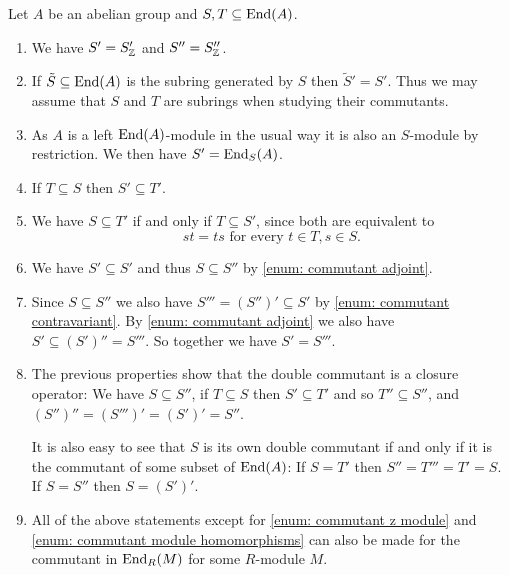 \begin{rem}
  Let $A$ be an abelian group and $S, T \subseteq \operatorname{End}(A)$.
  \begin{enumerate}[label=\emph{\alph*}),leftmargin=*]
    \item \label{enum: commutant z module}
      We have $S' = S'_{\mathbb{Z}}$ and $S'' = S''_{\mathbb{Z}}$.
    \item
      If $\tilde{S} \subseteq \operatorname{End}(A)$ is the subring generated by $S$ then $\tilde{S}' = S'$.
      Thus we may assume that $S$ and $T$ are subrings when studying their commutants.
    \item \label{enum: commutant module homomorphisms}
      As $A$ is a left $\operatorname{End}(A)$-module in the usual way it is also an $S$-module by restriction.
      We then have $S' = \operatorname{End}_S(A)$.
    \item \label{enum: commutant contravariant}
      If $T \subseteq S$ then $S' \subseteq T'$.
    \item \label{enum: commutant adjoint}
      We have $S \subseteq T'$ if and only if $T \subseteq S'$, since both are equivalent to
      \[
        st = ts
        \text{ for every }
        t \in T,
        s \in S.
      \]
    \item
      We have $S' \subseteq S'$ and thus $S \subseteq S''$ by \ref{enum: commutant adjoint}.
    \item
      Since $S \subseteq S''$ we also have $S''' = (S'')' \subseteq S'$ by \ref{enum: commutant contravariant}.
      By \ref{enum: commutant adjoint} we also have $S' \subseteq (S')'' = S'''$.
      So together we have $S' = S'''$.
    \item
      The previous properties show that the double commutant is a closure operator:
      We have $S \subseteq S''$, if $T \subseteq S$ then $S' \subseteq T'$ and so $T'' \subseteq S''$, and $(S'')'' = (S''')' = (S')' = S''$.
      
      It is also easy to see that $S$ is its own double commutant if and only if it is the commutant of some subset of $\operatorname{End}(A)$:
      If $S = T'$ then $S'' = T''' = T' = S$.
      If $S = S''$ then $S = (S')'$.
    \item
      All of the above statements except for \ref{enum: commutant z module} and \ref{enum: commutant module homomorphisms} can also be made for the commutant in $\operatorname{End}_R(M)$ for some $R$-module $M$.
  \end{enumerate}
\end{rem}


